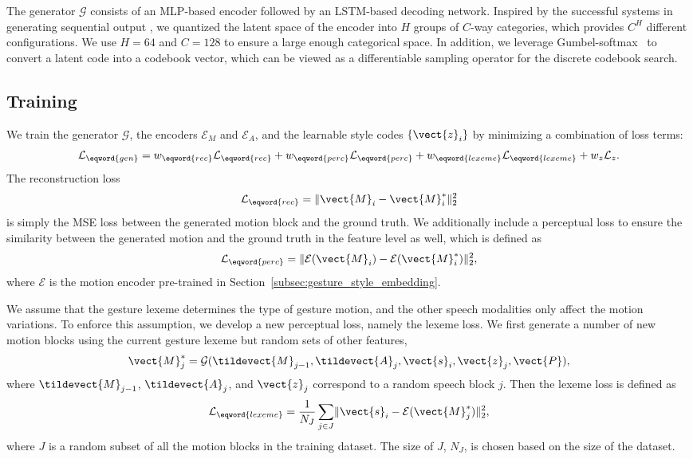 The generator $\mathcal{G}$ consists of an MLP-based encoder followed by an LSTM-based decoding network. Inspired by the successful systems in generating sequential output \citep{richard2021meshtalk,oord2017neural}, we quantized the latent space of the encoder into $H$ groups of $C$-way categories, which provides $C^H$ different configurations. We use $H=64$ and $C=128$ to ensure a large enough categorical space. In addition, we leverage Gumbel-softmax~\citep{jang2017categorical} to convert a latent code into a codebook vector, which can be viewed as a differentiable sampling operator for the discrete codebook search.

\subsection{Training}
We train the generator $\mathcal{G}$, the encoders $\mathcal{E}_M$ and $\mathcal{E}_A$, and the learnable style codes $\{\vect{z}_i\}$ by minimizing a combination of loss terms:
\begin{equation}
    \mathcal{L}_{\eqword{gen}} 
    = w_{\eqword{rec}}\mathcal{L}_{\eqword{rec}}
    + w_{\eqword{perc}}\mathcal{L}_{\eqword{perc}}
    + w_{\eqword{lexeme}}\mathcal{L}_{\eqword{lexeme}}
    + w_{{z}}\mathcal{L}_{{z}}.\label{eqn:generator_loss}
\end{equation}
The reconstruction loss 
\begin{equation}
    \mathcal{L}_{\eqword{rec}}=\lVert \vect{M}_i - \vect{M}_i^* \rVert_2^2   
\end{equation}
is simply the MSE loss between the generated motion block and the ground truth. We additionally include a perceptual loss to ensure the similarity between the generated motion and the ground truth in the feature level as well, which is defined as
\begin{equation}
    \mathcal{L}_{\eqword{perc}} = \lVert \mathcal{E}(\vect{M}_i) - \mathcal{E}(\vect{M}_i^*) \rVert_2^2 ,
\end{equation}
where $\mathcal{E}$ is the motion encoder pre-trained in Section~\ref{subsec:gesture_style_embedding}.

We assume that the gesture lexeme determines the type of gesture motion, and the other speech modalities only affect the motion variations. To enforce this assumption, we develop a new perceptual loss, namely the lexeme loss. We first generate a number of new motion blocks using the current gesture lexeme but random sets of other features, 
\begin{equation}
    \vect{M}^{*}_j = \mathcal{G}(\tildevect{M}_{j-1}, \tildevect{A}_{j}, \vect{s}_i, \vect{z}_j, \vect{P}) ,
\end{equation}
where $\tildevect{M}_{j-1}$, $\tildevect{A}_{j}$, and $\vect{z}_j$ correspond to a random speech block $j$. Then the lexeme loss is defined as 
\begin{equation}
    \mathcal{L}_{\eqword{lexeme}}=\frac{1}{N_J}\sum_{j\in{}J}\lVert \vect{s}_i - \mathcal{E}(\vect{M}_j^*) \rVert_2^2 ,
\end{equation}
where $J$ is a random subset of all the motion blocks in the training dataset. The size of $J$, $N_J$, is chosen based on the size of the dataset.

